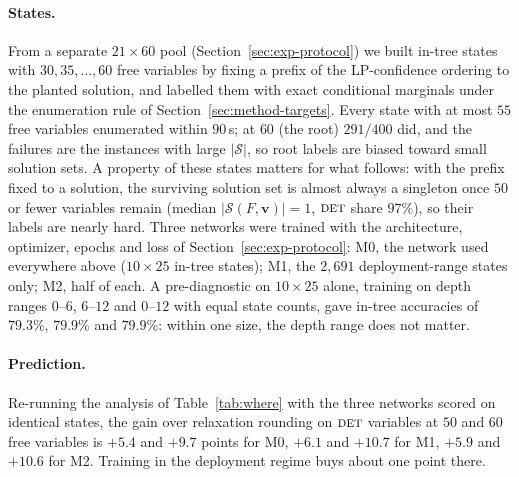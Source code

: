 \documentclass[preprint,12pt]{elsarticle}
\newcommand{\SOL}{\mathcal{S}}
\newcommand{\FORCED}{\textsc{det}}
\begin{document}
\paragraph{States.} From a separate $21\times60$ pool (Section~\ref{sec:exp-protocol}) we built in-tree states with $30,35,\dots,60$ free variables by fixing a prefix of the LP-confidence ordering to the planted solution, and labelled them with exact conditional marginals under the enumeration rule of Section~\ref{sec:method-targets}. Every state with at most $55$ free variables enumerated within $90$\,s; at $60$ (the root) $291/400$ did, and the failures are the instances with large $|\SOL|$, so root labels are biased toward small solution sets. A property of these states matters for what follows: with the prefix fixed to a solution, the surviving solution set is almost always a singleton once $50$ or fewer variables remain (median $|\SOL(F,\mathbf{v})|=1$, $\FORCED$ share $97\%$), so their labels are nearly hard. Three networks were trained with the architecture, optimizer, epochs and loss of Section~\ref{sec:exp-protocol}: \textsc{M0}, the network used everywhere above ($10\times25$ in-tree states); \textsc{M1}, the $2{,}691$ deployment-range states only; \textsc{M2}, half of each. A pre-diagnostic on $10\times25$ alone, training on depth ranges $0$--$6$, $6$--$12$ and $0$--$12$ with equal state counts, gave in-tree accuracies of $79.3\%$, $79.9\%$ and $79.9\%$: within one size, the depth range does not matter.

\paragraph{Prediction.} Re-running the analysis of Table~\ref{tab:where} with the three networks scored on identical states, the gain over relaxation rounding on $\FORCED$ variables at $50$ and $60$ free variables is $+5.4$ and $+9.7$ points for \textsc{M0}, $+6.1$ and $+10.7$ for \textsc{M1}, $+5.9$ and $+10.6$ for \textsc{M2}. Training in the deployment regime buys about one point there.
\end{document}
